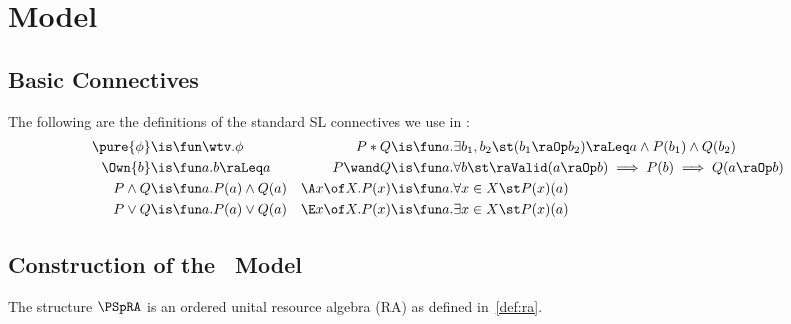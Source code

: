 \section{Model}
\label{sec:appendix:model}

\subsection{Basic Connectives}

The following are the definitions of the standard SL connectives
we use in \thelogic:
\begin{align*}
  \pure{\phi} &\is \fun \wtv. \phi
  &
  P * Q &\is \fun a.
    \exists b_1,b_2 \st
      (b_1 \raOp b_2) \raLeq a \land
      P(b_1) \land
      Q(b_2)
  \\
  \Own{b} &\is \fun a. b \raLeq a
  &
  P \wand Q &\is \fun a.
    \forall b\st
     \raValid(a \raOp b)
     \implies
     P(b)
     \implies
     Q(a \raOp b)
  \\
  P \land Q &\is \fun a. P(a) \land Q(a)
  &
  \A x \of X.P(x) &\is \fun a.
    \forall x \in X\st P(x)(a)
  \\
  P \lor Q &\is \fun a. P(a) \lor Q(a)
  &
  \E x \of X.P(x) &\is \fun a.
    \exists x \in X\st P(x)(a)
\end{align*}

\subsection{Construction of the \thelogic\ Model}

\begin{lemma}
  The structure $\PSpRA$ is an ordered unital resource algebra (RA) as defined
  in~\cref{def:ra}.
\end{lemma}

